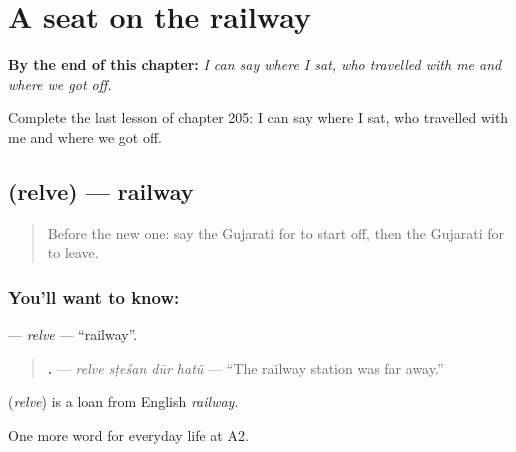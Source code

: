 
\chapter{A seat on the railway}
\label{ch:gu-a-seat-on-the-railway}

\begin{chapteropening}
\textbf{By the end of this chapter:} \emph{I can say where I sat, who travelled with me and where we got off.}

Complete the last lesson of chapter 205: I can say where I sat, who travelled with me and where we got off.
\end{chapteropening}

\section[\texorpdfstring{\gu{રેલવે} (relve)}{રેલવે (relve)}]{ (relve) — railway}

\label{lesson:GU-C205-relve}



\begin{quote}
Before the new one: say the Gujarati for to start off, then the Gujarati for to leave.
\end{quote}

\subsection*{You'll want to know: }
\textbf{} — \emph{relve} — \textquotedblleft{}railway\textquotedblright{}.

\begin{quote}
\textbf{   .} — \emph{relve sṭeśan dūr hatũ} — \textquotedblleft{}The railway station was far away.\textquotedblright{}
\end{quote}

\begin{cousinweb}
\textbf{} (\emph{relve}) is a loan from English \emph{railway}.
\end{cousinweb}

\begin{grammarlens}[title={What you've built}]
One more word for everyday life at A2.
\end{grammarlens}


